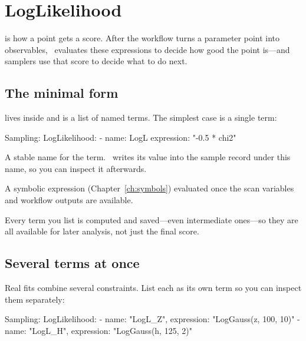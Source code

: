 \chapter{LogLikelihood}
\label{ch:loglikelihood}

 is how a point gets a score. After the workflow turns a
parameter point into observables, \Jarvis\ evaluates these expressions to decide how good the
point is---and samplers use that score to decide what to do next.

\section{The minimal form}
\label{sec:logl-minimal}

 lives inside  and is a list of named terms. The
simplest case is a single term:

\begin{yamlwin}
Sampling:
  LogLikelihood:
    - name: LogL
      expression: "-0.5 * chi2"
\end{yamlwin}

\begin{description}[style=nextline, leftmargin=1.2em]
  \item[\yamlkey{name}] A stable name for the term. \Jarvis\ writes its value into the sample
        record under this name, so you can inspect it afterwards.
  \item[\yamlkey{expression}] A symbolic expression (Chapter~\ref{ch:symbols}) evaluated once the
        scan variables and workflow outputs are available.
\end{description}

\begin{jnote}
Every term you list is computed and saved---even intermediate ones---so they are all available
for later analysis, not just the final score.
\end{jnote}

\section{Several terms at once}
\label{sec:logl-multi}

Real fits combine several constraints. List each as its own term so you can inspect them
separately:

\begin{yamlwin}
Sampling:
  LogLikelihood:
    - {name: "LogL_Z", expression: "LogGauss(z, 100, 10)"}
    - {name: "LogL_H", expression: "LogGauss(h, 125, 2)"}
\end{yamlwin}

